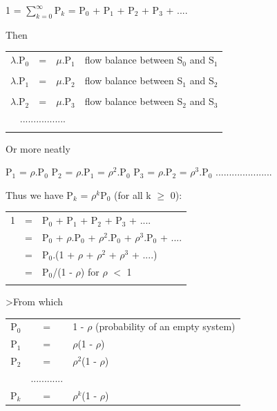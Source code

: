 \documentclass[12pt,fleqn]{report}
\begin{document}
\begin{center}
 1 = $\sum_{k=0}^{\infty}$P$_k$ 
    =  P$_0$ + P$_1$ + P$_2$ + P$_3$ + ....
\end{center}

\noindent
Then 

\begin{tabular}{r c l r}
$\lambda$.P$_0$ & = & $\mu$.P$_1$ & flow balance between S$_0$ and
S$_1$ \\
&&&\\
$\lambda$.P$_1$ & = & $\mu$.P$_2$ & flow balance between S$_1$ and
S$_2$ \\
&&&\\
$\lambda$.P$_2$ & = & $\mu$.P$_3$ & flow balance between S$_2$ and
S$_3$ \\
\multicolumn{3}{c}{.................}\\
&&&\\
\end{tabular}

\noindent
Or more neatly

\begin{center}
P$_1$ = $\rho$.P$_0$ \hspace*{0.25in}
P$_2$ = $\rho$.P$_1$ = $\rho^2$.P$_0$ \hspace*{0.25in}
P$_3$ = $\rho$.P$_2$ = $\rho^3$.P$_0$ \hspace*{0.25in}
.....................
\end{center}


\noindent
Thus we have P$_k$ = $\rho^k$P$_0$ (for all k $\geq$ 0):

\begin{tabular}{ r c l}
1 & = & P$_0$ + P$_1$ + P$_2$ + P$_3$ + ....  \\
  & = & P$_0$ + $\rho$.P$_0$ + $\rho^2$.P$_0$ + $\rho^3$.P$_0$ + ....  \\
  & = & P$_0$.(1 + $\rho$ + $\rho^2$ + $\rho^3$ + ....)\\
  & = & P$_0$/(1 - $\rho$)  \hfill for $\rho$ $<$ 1  \\
  & & \\
\end{tabular}

\noindent
>From which 

\begin{tabular}{r c l}
P$_0$ & = & 1 - $\rho$ \hspace*{2in} (probability of an empty system)\\
P$_1$ & = & $\rho$(1 - $\rho$) \\
P$_2$ & = & $\rho^2$(1 - $\rho$) \\
      & {............} & \\
P$_k$ & = & $\rho^k$(1 - $\rho$) \\
\end{tabular}
\end{document}
